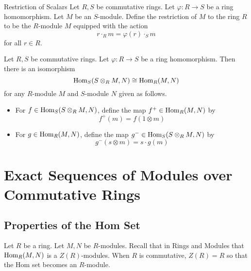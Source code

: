 \documentclass[a4paper]{article}
\begin{document}
\begin{defn}{Restriction of Scalars}{} Let $R,S$ be commutative rings. Let $\varphi:R\to S$ be a ring homomorphism. Let $M$ be an $S$-module. Define the restriction of $M$ to the ring $R$ to be the $R$-module $M$ equipped with the action $$r\cdot_R m=\varphi(r)\cdot_S m$$ for all $r\in R$. 
\end{defn}

\begin{thm}{}{} Let $R,S$ be commutative rings. Let $\varphi:R\to S$ be a ring homomorphism. Then there is an isomorphism $$\operatorname{Hom}_S(S\otimes_R M,N)\cong\operatorname{Hom}_R(M,N)$$ for any $R$-module $M$ and $S$-module $N$ given as follows. 
\begin{itemize}
\item For $f\in\operatorname{Hom}_S(S\otimes_R M,N)$, define the map $f^+\in\operatorname{Hom}_R(M,N)$ by $$f^+(m)=f(1\otimes m)$$
\item For $g\in\operatorname{Hom}_R(M,N)$, define the map $g^-\in\operatorname{Hom}_S(S\otimes_RM,N)$ by $$g^-(s\otimes m)=s\cdot g(m)$$
\end{itemize}
\end{thm}

\pagebreak
\section{Exact Sequences of Modules over Commutative Rings}
\subsection{Properties of the Hom Set}
Let $R$ be a ring. Let $M,N$ be $R$-modules. Recall that in Rings and Modules that $\operatorname{Hom}_R(M,N)$ is a $Z(R)$-modules. When $R$ is commutative, $Z(R)=R$ so that the Hom set becomes an $R$-module. 
\end{document}
